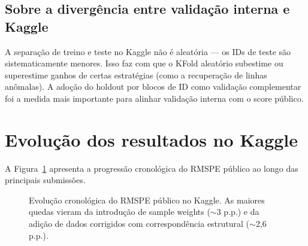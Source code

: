 \documentclass[12pt,a4paper]{article}
\begin{document}
\subsection{Sobre a divergência entre validação interna e Kaggle}

A separação de treino e teste no Kaggle não é aleatória --- os IDs de teste são sistematicamente menores. Isso faz com que o KFold aleatório subestime ou superestime ganhos de certas estratégias (como a recuperação de linhas anômalas). A adoção do holdout por blocos de ID como validação complementar foi a medida mais importante para alinhar validação interna com o score público.

\section{Evolução dos resultados no Kaggle}

A Figura~\ref{fig:evolucao_kaggle} apresenta a progressão cronológica do RMSPE público ao longo das principais submissões.

\begin{figure}[h]
\centering
{}
\caption{Evolução cronológica do RMSPE público no Kaggle. As maiores quedas vieram da introdução de sample weights ($\sim$3 p.p.) e da adição de dados corrigidos com correspondência estrutural ($\sim$2,6 p.p.).}
\label{fig:evolucao_kaggle}
\end{figure}
\end{document}

